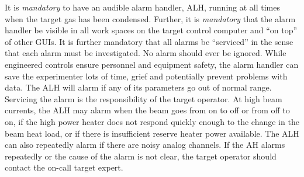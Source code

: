 \begin{safetyen}{0}{0} 
It is \emph{mandatory} to have an audible alarm handler, ALH, running
at all times when the target gas has been condensed.  Further, it is
\emph{mandatory} that the alarm handler be visible in all work spaces
on the target control computer and ``on top'' of other GUIs. It is
further mandatory that all alarms be ``serviced'' in the sense that
each alarm must be investigated. No alarm should ever be ignored.
While engineered controls ensure personnel and equipment safety, the
alarm handler can save the experimenter lots of time, grief and
potentially prevent problems with data. The ALH will alarm if any of
its parameters go out of normal range. Servicing the alarm is the
responsibility of the target operator. At high beam currents, the ALH
may alarm when the beam goes from on to off or from off to on, if the
high power heater does not respond quickly enough to the change in the
beam heat load, or if there is insufficient reserve heater power
available. The ALH can also repeatedly alarm if there are noisy analog
channels.
If the AH alarms repeatedly or the
cause of the alarm is not clear, the target operator should contact
the on-call target expert.
\end{safetyen}
